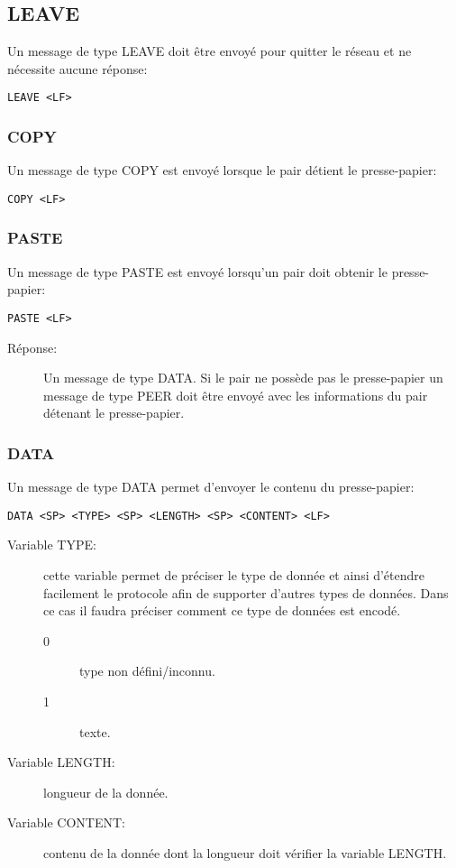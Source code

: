 \subsection*{LEAVE}
Un message de type LEAVE doit être envoyé pour quitter le réseau et ne
nécessite aucune réponse:
\begin{verbatim}
LEAVE <LF>
\end{verbatim}

\subsubsection*{COPY}
Un message de type COPY est envoyé lorsque le pair détient le presse-papier:
\begin{verbatim}
COPY <LF>
\end{verbatim}

\subsubsection*{PASTE}
Un message de type PASTE est envoyé lorsqu'un pair doit obtenir le
presse-papier:
\begin{verbatim}
PASTE <LF>
\end{verbatim}
\begin{description}
\item[Réponse:] Un message de type DATA. Si le pair ne possède pas le
  presse-papier un message de type PEER doit être envoyé avec les informations
  du pair détenant le presse-papier.
\end{description}

\subsubsection*{DATA}
Un message de type DATA permet d'envoyer le contenu du presse-papier:
\begin{verbatim}
DATA <SP> <TYPE> <SP> <LENGTH> <SP> <CONTENT> <LF>
\end{verbatim}
\begin{description}
\item[Variable TYPE:] cette variable permet de préciser le type
  de donnée et ainsi d'étendre facilement le protocole afin de supporter
  d'autres types de données. Dans ce cas il faudra préciser comment ce type
  de données est encodé.
  \begin{description}
  \item[0] type non défini/inconnu.
  \item[1] texte.
  \end{description}
\item[Variable LENGTH:] longueur de la donnée.
\item[Variable CONTENT:] contenu de la donnée dont la longueur
  doit vérifier la variable LENGTH.
\end{description}

